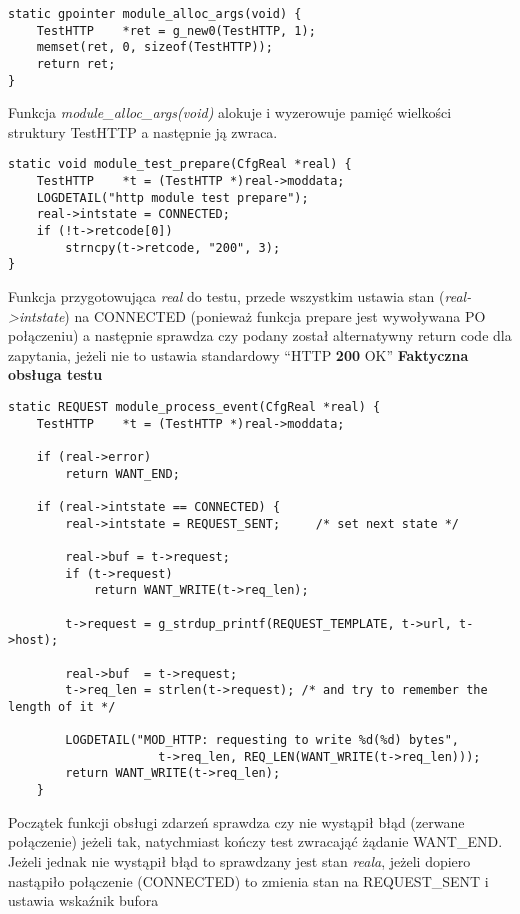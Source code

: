 \documentclass[polish,12pt]{article}
\begin{document}
\begin{verbatim}
static gpointer module_alloc_args(void) {
    TestHTTP    *ret = g_new0(TestHTTP, 1);
    memset(ret, 0, sizeof(TestHTTP));
    return ret;
}
\end{verbatim}
Funkcja \textit{module\_alloc\_args(void)} alokuje i wyzerowuje pamięć wielkości struktury TestHTTP
a następnie ją zwraca.
\newline
\newline
\begin{verbatim}
static void module_test_prepare(CfgReal *real) {
    TestHTTP    *t = (TestHTTP *)real->moddata;
    LOGDETAIL("http module test prepare");
    real->intstate = CONNECTED;
    if (!t->retcode[0])
        strncpy(t->retcode, "200", 3);
}
\end{verbatim}
Funkcja przygotowująca \textit{real} do testu, przede wszystkim ustawia stan (\textit{real->intstate})
na CONNECTED (ponieważ funkcja prepare jest wywoływana PO połączeniu) a następnie sprawdza czy podany
został alternatywny return code dla zapytania, jeżeli nie to ustawia standardowy ``HTTP \textbf{200} OK''
\newpage
\large \textbf{Faktyczna obsługa testu}\newline
\normalsize
{\small
\begin{verbatim}
static REQUEST module_process_event(CfgReal *real) {
    TestHTTP    *t = (TestHTTP *)real->moddata;

    if (real->error)
        return WANT_END;

    if (real->intstate == CONNECTED) {
        real->intstate = REQUEST_SENT;     /* set next state */

        real->buf = t->request;
        if (t->request)
            return WANT_WRITE(t->req_len);

        t->request = g_strdup_printf(REQUEST_TEMPLATE, t->url, t->host);

        real->buf  = t->request;
        t->req_len = strlen(t->request); /* and try to remember the length of it */

        LOGDETAIL("MOD_HTTP: requesting to write %d(%d) bytes",
                     t->req_len, REQ_LEN(WANT_WRITE(t->req_len)));
        return WANT_WRITE(t->req_len);
    }
\end{verbatim}
}
Początek funkcji obsługi zdarzeń sprawdza czy nie wystąpił błąd (zerwane połączenie) jeżeli tak, natychmiast
kończy test zwracająć żądanie WANT\_END.
\newline
Jeżeli jednak nie wystąpił błąd to sprawdzany jest stan \textit{reala},
jeżeli dopiero nastąpiło połączenie (CONNECTED) to zmienia stan na REQUEST\_SENT i ustawia wskaźnik bufora
\end{document}
